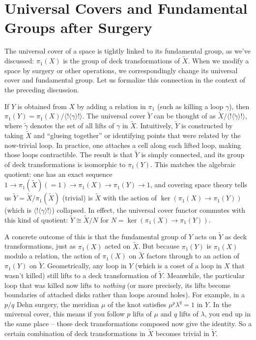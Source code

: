 \documentclass[11pt]{article}
\theoremstyle{remark}
\begin{document}
\section*{Universal Covers and Fundamental Groups after Surgery}
The universal cover of a space is tightly linked to its fundamental group, as we’ve discussed: $\pi_1(X)$ is the group of deck transformations of $\widetilde{X}$. When we modify a space by surgery or other operations, we correspondingly change its universal cover and fundamental group. Let us formalize this connection in the context of the preceding discussion.

If $Y$ is obtained from $X$ by adding a relation in $\pi_1$ (such as killing a loop $\gamma$), then $\pi_1(Y) = \pi_1(X)/\langle!\langle \gamma\rangle!\rangle$. The universal cover $\widetilde{Y}$ can be thought of as $\widetilde{X}/\langle!\langle \widetilde{\gamma}\rangle!\rangle$, where $\widetilde{\gamma}$ denotes the set of all lifts of $\gamma$ in $\widetilde{X}$. Intuitively, $\widetilde{Y}$ is constructed by taking $\widetilde{X}$ and “glueing together” or identifying points that were related by the now-trivial loop. In practice, one attaches a cell along each lifted loop, making those loops contractible. The result is that $\widetilde{Y}$ is simply connected, and its group of deck transformations is isomorphic to $\pi_1(Y)$. This matches the algebraic quotient: one has an exact sequence $1 \to \pi_1(\widetilde{X}) (=1) \to \pi_1(X) \to \pi_1(Y)\to 1$, and covering space theory tells us $\widetilde{Y} = \widetilde{X}/\pi_1(\widetilde{X})$ (trivial) is $\widetilde{X}$ with the action of $\ker(\pi_1(X)\to\pi_1(Y))$ (which is $\langle!\langle\gamma\rangle!\rangle$) collapsed. In effect, the universal cover functor commutes with this kind of quotient: $\widetilde{Y} \cong \widetilde{X}/N$ for $N=\ker(\pi_1(X)\to\pi_1(Y))$.

A concrete outcome of this is that the fundamental group of $Y$ acts on $\widetilde{Y}$ as deck transformations, just as $\pi_1(X)$ acted on $\widetilde{X}$. But because $\pi_1(Y)$ is $\pi_1(X)$ modulo a relation, the action of $\pi_1(X)$ on $\widetilde{X}$ factors through to an action of $\pi_1(Y)$ on $\widetilde{Y}$. Geometrically, any loop in $Y$ (which is a coset of a loop in $X$ that wasn’t killed) still lifts to a deck transformation of $\widetilde{Y}$. Meanwhile, the particular loop that was killed now lifts to \textit{nothing} (or more precisely, its lifts become boundaries of attached disks rather than loops around holes). For example, in a $p/q$ Dehn surgery, the meridian $\mu$ of the knot satisfies $\mu^p \lambda^q = 1$ in $Y$. In the universal cover, this means if you follow $p$ lifts of $\mu$ and $q$ lifts of $\lambda$, you end up in the same place – those deck transformations composed now give the identity. So a certain combination of deck transformations in $\widetilde{X}$ becomes trivial in $\widetilde{Y}$.
\end{document}
